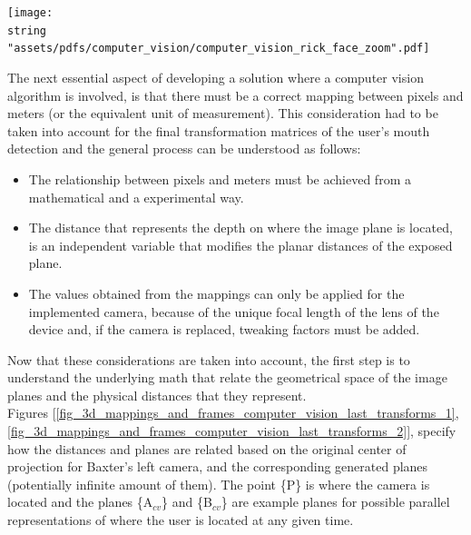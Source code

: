 \documentclass[11pt]{report} %
\begin{document}
\begin{center}
\texttt{[image: \\string "assets/pdfs/computer\_vision/computer\_vision\_rick\_face\_zoom".pdf]}
\bigbreak
\begin{minipage}{\linewidth} %
\label{fig_rick_face_zoom}
\end{minipage} \end{center}


The next essential aspect of developing a solution where a computer vision algorithm is involved, is that there must be a correct mapping between pixels and meters (or the equivalent unit of measurement). This consideration had to be taken into account for the final transformation matrices of the user's mouth detection and the general process can be understood as follows:

\begin{itemize}
    \item The relationship between pixels and meters must be achieved from a mathematical and a experimental way.
    \item The distance that represents the depth on where the image plane is located, is an independent variable that modifies the planar distances of the exposed plane.
    \item The values obtained from the mappings can only be applied for the implemented camera, because of the unique focal length of the lens of the device and, if the camera is replaced, tweaking factors must be added.
\end{itemize}

Now that these considerations are taken into account, the first step is to understand the underlying math that relate the geometrical space of the image planes and the physical distances that they represent.\\

Figures [\ref{fig_3d_mappings_and_frames_computer_vision_last_transforms_1}, \ref{fig_3d_mappings_and_frames_computer_vision_last_transforms_2}], specify how the distances and planes are related based on the original center of projection for Baxter's left camera, and the corresponding generated planes (potentially infinite amount of them). The point \{P\} is where the camera is located and the planes \{A$_{cv}$\} and \{B$_{cv}$\} are example planes for possible parallel representations of where the user is located at any given time.\\
\end{document}
